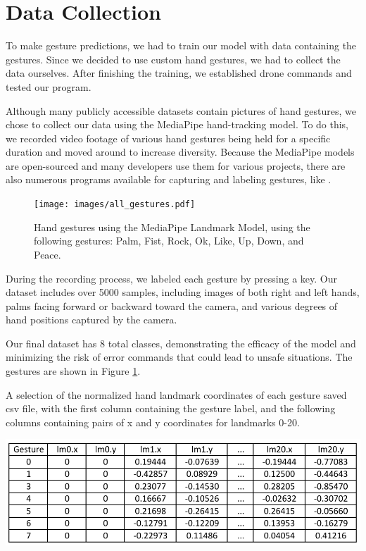 \section{Data Collection}

To make gesture predictions, we had to train our model with data containing the gestures. Since we decided to use custom hand gestures, we had to collect the data ourselves. After finishing the training, we established drone commands and tested our program.

Although many publicly accessible datasets contain pictures of hand gestures, we chose to collect our data using the MediaPipe hand-tracking model. To do this, we recorded video footage of various hand gestures being held for a specific duration and moved around to increase diversity. Because the MediaPipe models are open-sourced and many developers use them for various projects, there are also numerous programs available for capturing and labeling gestures, like \cite{opencv_mediapipe_hand_gesture_recognition}.
\begin{figure}[h!]
	\centering
	\texttt{[image: images/all\_gestures.pdf]}
	\caption{Hand gestures using the MediaPipe Landmark Model, using the following gestures: Palm, Fist, Rock, Ok, Like, Up, Down, and Peace.}
	\label{fig:all_gestures}
\end{figure}


 During the recording process, we labeled each gesture by pressing a key. Our dataset includes over 5000 samples, including images of both right and left hands, palms facing forward or backward toward the camera, and various degrees of hand positions captured by the camera.



Our final dataset has 8 total classes, demonstrating the efficacy of the model and minimizing the risk of error commands that could lead to unsafe situations. The gestures are shown in Figure \ref{fig:all_gestures}.


\begin{table}[h]
	\centering
	\caption{A selection of the normalized hand landmark coordinates of each gesture saved csv file, with the first column containing the gesture label, and the following columns containing pairs of x and y coordinates for landmarks 0-20.}
	\includegraphics[width = \textwidth]{images/gesture_laandmarks-cropped.pdf}
	\label{tab:saved_csv} %
\end{table}



